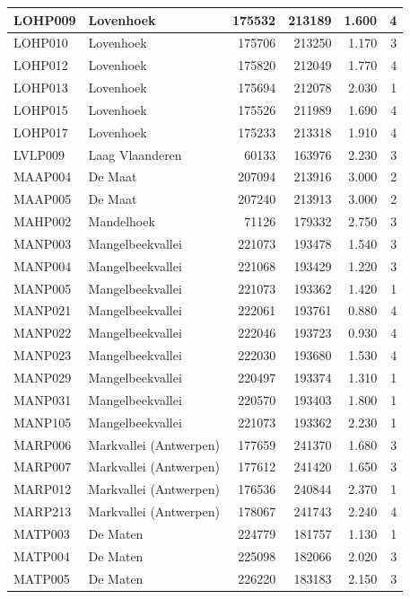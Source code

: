 \documentclass[11pt,]{book}
\begin{document}
\begin{table}
\begin{tabular}[t]{l|l|r|r|r|r}
\hline
LOHP009 & Lovenhoek & 175532 & 213189 & 1.600 & 4\\
\hline
LOHP010 & Lovenhoek & 175706 & 213250 & 1.170 & 3\\
\hline
LOHP012 & Lovenhoek & 175820 & 212049 & 1.770 & 4\\
\hline
LOHP013 & Lovenhoek & 175694 & 212078 & 2.030 & 1\\
\hline
LOHP015 & Lovenhoek & 175526 & 211989 & 1.690 & 4\\
\hline
LOHP017 & Lovenhoek & 175233 & 213318 & 1.910 & 4\\
\hline
LVLP009 & Laag Vlaanderen & 60133 & 163976 & 2.230 & 3\\
\hline
MAAP004 & De Maat & 207094 & 213916 & 3.000 & 2\\
\hline
MAAP005 & De Maat & 207240 & 213913 & 3.000 & 2\\
\hline
MAHP002 & Mandelhoek & 71126 & 179332 & 2.750 & 3\\
\hline
MANP003 & Mangelbeekvallei & 221073 & 193478 & 1.540 & 3\\
\hline
MANP004 & Mangelbeekvallei & 221068 & 193429 & 1.220 & 3\\
\hline
MANP005 & Mangelbeekvallei & 221073 & 193362 & 1.420 & 1\\
\hline
MANP021 & Mangelbeekvallei & 222061 & 193761 & 0.880 & 4\\
\hline
MANP022 & Mangelbeekvallei & 222046 & 193723 & 0.930 & 4\\
\hline
MANP023 & Mangelbeekvallei & 222030 & 193680 & 1.530 & 4\\
\hline
MANP029 & Mangelbeekvallei & 220497 & 193374 & 1.310 & 1\\
\hline
MANP031 & Mangelbeekvallei & 220570 & 193403 & 1.800 & 1\\
\hline
MANP105 & Mangelbeekvallei & 221073 & 193362 & 2.230 & 1\\
\hline
MARP006 & Markvallei (Antwerpen) & 177659 & 241370 & 1.680 & 3\\
\hline
MARP007 & Markvallei (Antwerpen) & 177612 & 241420 & 1.650 & 3\\
\hline
MARP012 & Markvallei (Antwerpen) & 176536 & 240844 & 2.370 & 1\\
\hline
MARP213 & Markvallei (Antwerpen) & 178067 & 241743 & 2.240 & 4\\
\hline
MATP003 & De Maten & 224779 & 181757 & 1.130 & 1\\
\hline
MATP004 & De Maten & 225098 & 182066 & 2.020 & 3\\
\hline
MATP005 & De Maten & 226220 & 183183 & 2.150 & 3\\

\end{tabular}
\end{table}
\end{document}
